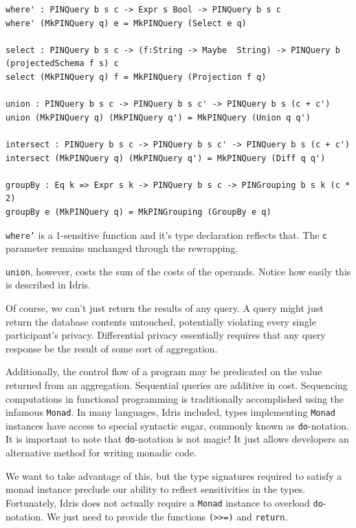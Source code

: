 \documentclass[12pt]{article}
\begin{document}
\begin{lstlisting}
where' : PINQuery b s c -> Expr s Bool -> PINQuery b s c
where' (MkPINQuery q) e = MkPINQuery (Select e q)

select : PINQuery b s c -> (f:String -> Maybe  String) -> PINQuery b (projectedSchema f s) c
select (MkPINQuery q) f = MkPINQuery (Projection f q)

union : PINQuery b s c -> PINQuery b s c' -> PINQuery b s (c + c')
union (MkPINQuery q) (MkPINQuery q') = MkPINQuery (Union q q')

intersect : PINQuery b s c -> PINQuery b s c' -> PINQuery b s (c + c')
intersect (MkPINQuery q) (MkPINQuery q') = MkPINQuery (Diff q q')

groupBy : Eq k => Expr s k -> PINQuery b s c -> PINGrouping b s k (c * 2)
groupBy e (MkPINQuery q) = MkPINGrouping (GroupBy e q)
\end{lstlisting}

\texttt{where'} is a 1-sensitive function and it's type declaration reflects that.
The \texttt{c} parameter remains unchanged through the rewrapping.

\texttt{union}, however, costs the sum of the costs of the operands.
Notice how easily this is described in Idris.

Of course, we can't just return the results of any query.
A query might just return the database contents untouched, potentially violating every single participant's privacy.
Differential privacy essentially requires that any query response be the result of some sort of aggregation.

Additionally, the control flow of a program may be predicated on the value returned from an aggregation.
Sequential queries are additive in cost.
Sequencing computations in functional programming is traditionally accomplished using the infamous \texttt{Monad}.
In many languages, Idris included, types implementing \texttt{Monad} instances have access to special syntactic sugar, commonly known as \texttt{do}-notation.
It is important to note that \texttt{do}-notation is not magic!
It just allows developers an alternative method for writing monadic code.

We want to take advantage of this, but the type signatures required to satisfy a monad instance preclude our ability to reflect sensitivities in the types.
Fortunately, Idris does not actually require a \texttt{Monad} instance to overload \texttt{do}-notation.
We just need to provide the functions \texttt{(>>=)} and \texttt{return}.
\end{document}
